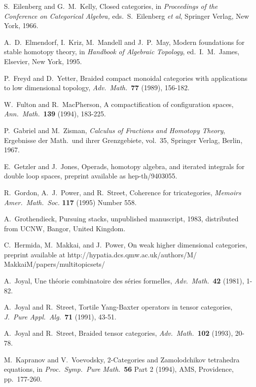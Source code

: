 {\begin{thebibliography}{10}
 S.\ Eilenberg and G.\ M.\ Kelly, Closed categories, in
{\sl Proceedings of the Conference on Categorical Algebra,} eds.\ S.\
Eilenberg {\it et al}, Springer Verlag, New York, 1966.

 A.\ D.\ Elmendorf, I.\ Kriz, M.\ Mandell and J.\ P.\ 
May, Modern foundations for stable homotopy theory, in {\sl Handbook of
Algebraic Topology}, ed.\ I.\ M.\ James, Elsevier, New York, 1995.

\bibitem{FY} P.\ Freyd and D.\ Yetter, Braided compact monoidal
categories with applications to low dimensional topology, {\sl
Adv.\ Math.\ }{\bf 77} (1989), 156-182.

 W.\ Fulton and R.\ MacPherson, A compactification of
configuration spaces, {\sl Ann.\ Math.\ }{\bf 139} (1994), 183-225.

\bibitem{GZ} P.\ Gabriel and M.\ Zisman, {\sl Calculus of Fractions
and Homotopy Theory}, Ergebnisse der Math.\ und ihrer Grenzgebiete,
vol.\ 35, Springer Verlag, Berlin, 1967.

 E.\ Getzler and J.\ Jones, Operads, homotopy algebra, and
iterated integrals for double loop spaces, preprint available as
hep-th/9403055.

 R.\ Gordon, A.\ J.\ Power, and R.\ Street, Coherence for
tricategories, {\sl Memoirs Amer.\ Math.\ Soc.} {\bf 117} (1995)
Number 558.

 A.\ Grothendieck, Pursuing stacks, unpublished
manuscript, 1983, distributed from UCNW, Bangor, United Kingdom.

\bibitem{HMP} C.\ Hermida, M.\ Makkai, and J.\ Power, On weak
higher dimensional categories, preprint available at
http://hypatia.dcs.qmw.ac.uk/authors/M/ \break \hfill 
MakkaiM/papers/multitopicsets/ 

 A.\ Joyal, Une th\'eorie combinatoire des s\'eries 
formelles, {\sl Adv.\ Math.\ }{\bf 42} (1981), 1-82.

 A.\ Joyal and R.\ Street, Tortile Yang-Baxter operators in
tensor categories, {\sl J.\ Pure Appl.\ Alg.\ }{\bf 71} (1991), 43-51.

\bibitem{JS2} A.\ Joyal and R.\ Street, Braided tensor categories,
{\sl Adv.\ Math.\ }{\bf 102} (1993), 20-78.

 M.\ Kapranov and V.\ Voevodsky, 2-Categories and
Zamolodchikov tetrahedra equations, in {\sl Proc.\ Symp.\ Pure
Math.\ }{\bf 56} Part 2 (1994), AMS, Providence, pp.\ 177-260.


\end{thebibliography}}
